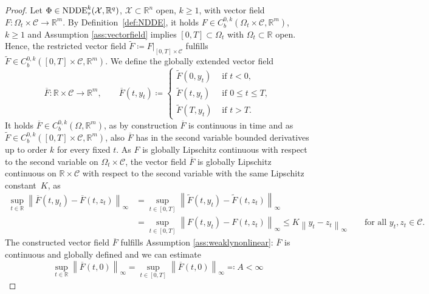 \documentclass[10pt]{article}
\numberwithin{equation}{section}
\newcommand\norm[1]{\left\lVert#1\right\rVert}
\begin{document}
	\begin{proof}
		Let  $\Phi \in \textup{NDDE}_\tau^k(\mathcal{X},\mathbb{R}^q)$, $\mathcal{X}\subset \mathbb{R}^n$ open, $k\geq1$, with vector field $F:\Omega_t \times \mathcal{C}\rightarrow \mathbb{R}^m$. By Definition~\ref{def:NDDE}, it holds $F\in C_b^{0,k}(\Omega_t \times \mathcal{C},\mathbb{R}^m)$, $k\geq 1$ and Assumption \ref{ass:vectorfield} implies $[0,T]\subset \Omega_t$ with $\Omega_t \subset \mathbb{R}$ open. Hence, the restricted vector field $\widetilde F \coloneqq F \vert_{[0,T]\times \mathcal{C}}$ fulfills $\widetilde F\in C_b^{0,k}([0,T]\times \mathcal{C},\mathbb{R}^m)$. We define the globally extended vector field
		\begin{equation*}
			\overline{F}: \mathbb{R} \times \mathcal{C} \rightarrow \mathbb{R}^m, \qquad \overline{F}(t,y_t) \coloneqq \begin{cases}
				\widetilde F(0,y_t)  &\text{ if } t<0, \\
				\widetilde F(t,y_t)  &\text{ if } 0\leq t \leq T, \\
				\widetilde F(T,y_t) &\text{ if } t >T.
			\end{cases}
		\end{equation*}
		It holds $\overline F\in C_b^{0,k}(\Omega,\mathbb{R}^m)$, as by construction $\overline{F}$ is continuous in time and as $\widetilde F\in C_b^{0,k}([0,T]\times \mathcal{C},\mathbb{R}^m)$, also $\overline{F}$ has in the second variable bounded derivatives up to order $k$ for every fixed $t$.
		As $F$ is globally Lipschitz continuous with respect to the second variable on $\Omega_t\times \mathcal{C}$, the vector field $\overline{F}$ is globally Lipschitz continuous on $\mathbb{R}\times \mathcal{C}$ with respect to the second variable with the same Lipschitz constant~$K$, as
		\begin{align*}
			\sup_{t \in \mathbb{R}}\norm{\overline{F}(t,y_t)-\overline{F}(t,z_t)}_\infty& = \sup_{t \in [0,T]}\norm{\widetilde F(t,y_t)- \widetilde F(t,z_t)}_\infty \\
			& = \sup_{t \in [0,T]}\norm{F(t,y_t)-F(t,z_t)}_\infty\leq K \norm{y_t-z_t}_\infty \qquad \text{for all } y_t,z_t \in \mathcal{C}.
		\end{align*}
		The constructed vector field $\overline{F}$ fulfills Assumption \ref{ass:weaklynonlinear}: $\overline{F}$ is continuous and globally defined and we can estimate
		\begin{equation*}
			\sup_{t \in \mathbb{R}}\norm{\overline{F}(t,0)}_\infty = 	\sup_{t \in [0,T]}\norm{\overline{F}(t,0)}_\infty \eqqcolon A < \infty

\end{equation*}
\end{proof}
\end{document}
